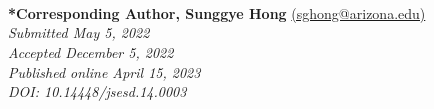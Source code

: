 \documentclass[11pt]{sig-alternate}
\begin{document}


\\ \\ \\
\textbf{*Corresponding Author, Sunggye Hong} \href{mailto:sghong@arizona.edu}{(sghong@arizona.edu)} \\
\textit{Submitted May 5, 2022 }\\
\textit{Accepted December 5, 2022} \\
\textit{Published online April 15, 2023} \\
\textit{DOI: 10.14448/jsesd.14.0003} \\


\pagebreak
\pagebreak

\vspace{5mm}
\section*{\vspace{140mm}}
\end{document}
